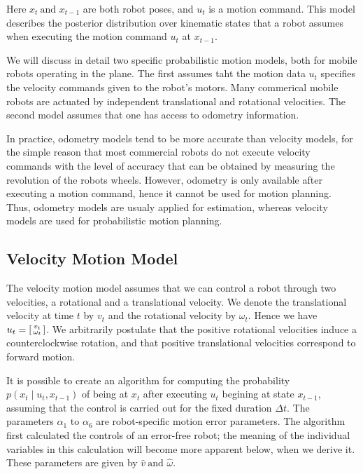 \documentclass[14pt,letterpaper]{article}
\theoremstyle{definition}
\newcommand{\pcond}[2]{p(#1 \mid #2)}
\begin{document}
Here $x_t \ \text{and } x_{t-1}$ are both robot poses, and $u_t$ is a motion command. This model describes the posterior distribution over kinematic states that a robot assumes when executing the motion command $u_t$ at $x_{t-1}$.

We will discuss in detail two specific probabilistic motion models, both for mobile robots operating in the plane.
The first assumes taht the motion data $u_t$ specifies the velocity commands given to the robot's motors. Many commerical mobile robots are actuated by independent translational and rotational velocities.
The second model assumes that one has access to odometry information.

In practice, odometry models tend to be more accurate than velocity models, for the simple reason that most commercial robots do not execute velocity commands with the level of accuracy that can be obtained by measuring the revolution of the robots wheels.
However, odometry is only available after executing a motion command, hence it cannot be used for motion planning. Thus, odometry models are usualy applied for estimation, whereas velocity models are used for probabilistic motion planning.

\subsection{Velocity Motion Model}
The velocity motion model assumes that we can control a robot through two velocities, a rotational and a translational velocity.
We denote the translational velocity at time $t$ by $v_t$ and the rotational velocity by $\omega_t$. Hence we have $u_t = \begin{bsmallmatrix} v_t \\ \omega_t \end{bsmallmatrix}$.
We arbitrarily postulate that the positive rotational velocities induce a counterclockwise rotation, and that positive translational velocities correspond to forward motion.

It is possible to create an algorithm for computing the probability $\pcond{x_t}{u_t, x_{t-1}}$ of being at $x_t$ after executing $u_t$ begining at state $x_{t-1}$, assuming that the control is carried out for the fixed duration $\Delta t$.
The parameters $\alpha_1 \text{ to } \alpha_6$ are robot-specific motion error parameters.
The algorithm first calculated the controls of an error-free robot; the meaning of the individual variables in this calculation will become
more apparent below, when we derive it. These parameters are given by $\hat{v} \ \text{and } \hat{\omega}$.
\end{document}
